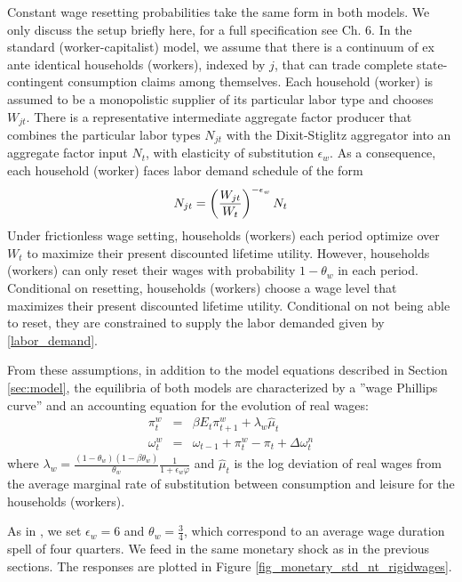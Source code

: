 Constant wage resetting probabilities take the same form in both models. We only discuss the setup briefly here, for a full specification see \citet{Gali1999} Ch. 6. In the standard (worker-capitalist) model, we assume that there is a continuum of ex ante identical households (workers), indexed by $j$, that can trade complete state-contingent consumption claims among themselves. Each household (worker) is assumed to be a monopolistic supplier of its particular labor type and chooses $W_{jt}$. There is a representative intermediate aggregate factor producer that combines the particular labor types $N_{jt}$ with the Dixit-Stiglitz aggregator into an aggregate factor input $N_t$, with elasticity of substitution $\epsilon_w$. As a consequence, each household (worker) faces labor demand schedule of the form
\begin{eqnarray}
\lb{labor_demand}
N_{jt}=\left(\frac{W_{jt}}{W_t}\right)^{-\epsilon_w} N_t
\end{eqnarray}
Under frictionless wage setting, households (workers) each period optimize over $W_t$ to maximize their present discounted lifetime utility. However, households (workers) can only reset their wages with probability $1-\theta_w$ in each period. Conditional on resetting, households (workers) choose a wage level that maximizes their present discounted lifetime utility. Conditional on not being able to reset, they are constrained to supply the labor demanded given by \eqref{labor_demand}.

From these assumptions, in addition to the model equations described in Section \ref{sec:model}, the equilibria of both models are characterized by a ''wage Phillips curve'' and an accounting equation for the evolution of real wages:
\begin{eqnarray}
\pi^w_t &=& \beta E_t \pi^w_{t+1} + \lambda_w \hat \mu_{t} \\
\omega^w_t &=& \omega_{t-1} + \pi^w_{t} - \pi_t + \Delta \omega^n_t
\end{eqnarray}
where $\lambda_w=\frac{(1-\theta_w)(1-\beta \theta_w)}{\theta_w} \frac{1}{1+\epsilon_w \varphi}$ and $\hat \mu_{t}$ is the log deviation of real wages from the average marginal rate of substitution between consumption and leisure for the households (workers).

As in \citet{Gali1999}, we set $\epsilon_w=6$ and $\theta_w=\frac{3}{4}$, which correspond to an average wage duration spell of four quarters. We feed in the same monetary shock as in the previous sections. The responses are plotted in Figure \ref{fig_monetary_std_nt_rigidwages}.

